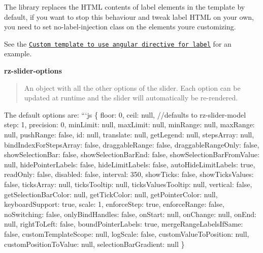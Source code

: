 The library replaces the H\+T\+ML contents of label elements in the template by default, if you want to stop this behaviour and tweak label H\+T\+ML on your own, you need to set {\ttfamily no-\/label-\/injection} class on the elements you\textquotesingle{}re customizing.

See the \href{./demo/directiveInCustomTemplate.html}{\tt Custom template to use angular directive for label} for an example.

{\bfseries rz-\/slider-\/options}

\begin{quote}
An object with all the other options of the slider. Each option can be updated at runtime and the slider will automatically be re-\/rendered. \end{quote}


The default options are\+: ```js \{ floor\+: 0, ceil\+: null, //defaults to rz-\/slider-\/model step\+: 1, precision\+: 0, min\+Limit\+: null, max\+Limit\+: null, min\+Range\+: null, max\+Range\+: null, push\+Range\+: false, id\+: null, translate\+: null, get\+Legend\+: null, steps\+Array\+: null, bind\+Index\+For\+Steps\+Array\+: false, draggable\+Range\+: false, draggable\+Range\+Only\+: false, show\+Selection\+Bar\+: false, show\+Selection\+Bar\+End\+: false, show\+Selection\+Bar\+From\+Value\+: null, hide\+Pointer\+Labels\+: false, hide\+Limit\+Labels\+: false, auto\+Hide\+Limit\+Labels\+: true, read\+Only\+: false, disabled\+: false, interval\+: 350, show\+Ticks\+: false, show\+Ticks\+Values\+: false, ticks\+Array\+: null, ticks\+Tooltip\+: null, ticks\+Values\+Tooltip\+: null, vertical\+: false, get\+Selection\+Bar\+Color\+: null, get\+Tick\+Color\+: null, get\+Pointer\+Color\+: null, keyboard\+Support\+: true, scale\+: 1, enforce\+Step\+: true, enforce\+Range\+: false, no\+Switching\+: false, only\+Bind\+Handles\+: false, on\+Start\+: null, on\+Change\+: null, on\+End\+: null, right\+To\+Left\+: false, bound\+Pointer\+Labels\+: true, merge\+Range\+Labels\+If\+Same\+: false, custom\+Template\+Scope\+: null, log\+Scale\+: false, custom\+Value\+To\+Position\+: null, custom\+Position\+To\+Value\+: null, selection\+Bar\+Gradient\+: null \} 
